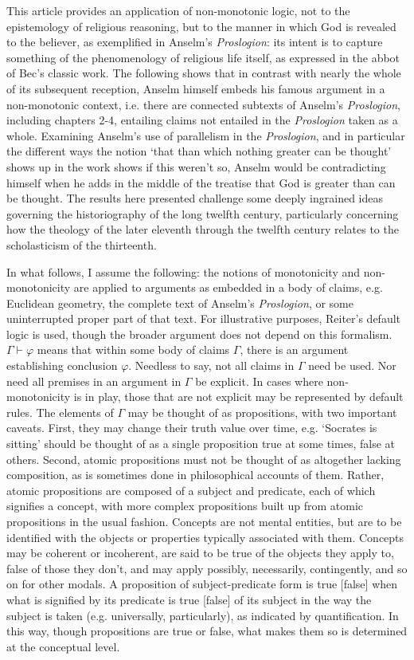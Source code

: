 \documentclass[]{birkjour}
\begin{document}
This article provides an application of non-monotonic logic, not to the epistemology of religious reasoning, but to the manner in which God is revealed to the believer, as exemplified in Anselm's \textit{Proslogion}: its intent is to capture something of the phenomenology of religious life itself, as expressed in the abbot of Bec's classic work.	The following shows that in contrast with nearly the whole of its subsequent reception, Anselm himself embeds his famous argument in a non-monotonic context, i.e. there are connected subtexts of Anselm's \textit{Proslogion}, including chapters 2-4, entailing claims not entailed in the \textit{Proslogion} taken as a whole. Examining Anselm's use of parallelism in the \textit{Proslogion}, and in particular the different ways the notion `that than which nothing greater can be thought' shows up in the work shows if this weren't so, Anselm would be contradicting himself when he adds in the middle of the treatise that God is greater than can be thought. The results here presented challenge some deeply ingrained ideas governing the historiography of the long twelfth century, particularly concerning how the theology of the later eleventh through the twelfth century relates to the scholasticism of the thirteenth.	

In what follows, I assume the following: the notions of monotonicity and non-monotonicity are applied to arguments as embedded in a body of claims, e.g. Euclidean geometry, the complete text of Anselm's \textit{Proslogion}, or some uninterrupted proper part of that text. For illustrative purposes, Reiter's default logic is used, though the broader argument does not depend on this formalism. $\Gamma \vdash \varphi$ means that within some body of claims $\Gamma$, there is an argument establishing conclusion $\varphi$. Needless to say, not all claims in $\Gamma$ need be used. Nor need all premises in an argument in $\Gamma$ be explicit. In cases where non-monotonicity is in play, those that are not explicit may be represented by default rules. The elements of $\Gamma$ may be thought of as propositions, with two important caveats. First, they may change their truth value over time, e.g. `Socrates is sitting' should be thought of as a single proposition true at some times, false at others. Second, atomic propositions must not be thought of as altogether lacking composition, as is sometimes done in philosophical accounts of them. Rather, atomic propositions are composed of a subject and predicate, each of which signifies a concept, with more complex propositions built up from atomic propositions in the usual fashion. Concepts are not mental entities, but are to be identified with the objects or properties typically associated with them. Concepts may be coherent or incoherent, are said to be true of the objects they apply to, false of those they don't, and may apply possibly, necessarily, contingently, and so on for other modals. A proposition of subject-predicate form is true [false] when what is signified by its predicate is true [false] of its subject in the way the subject is taken (e.g. universally, particularly), as indicated by quantification. In this way, though propositions are true or false, what makes them so is determined at the conceptual level.
\end{document}
